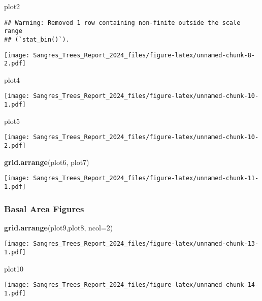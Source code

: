 \documentclass[
]{article}
\newenvironment{Shaded}{\begin{snugshade}}{\end{snugshade}}
\newcommand{\AttributeTok}[1]{\textcolor[rgb]{0.13,0.29,0.53}{#1}}
\newcommand{\DecValTok}[1]{\textcolor[rgb]{0.00,0.00,0.81}{#1}}
\newcommand{\FunctionTok}[1]{\textcolor[rgb]{0.13,0.29,0.53}{\textbf{#1}}}
\newcommand{\NormalTok}[1]{#1}
\begin{document}
\begin{Shaded}
\begin{Highlighting}[]
\NormalTok{plot2}
\end{Highlighting}
\end{Shaded}

\begin{verbatim}
## Warning: Removed 1 row containing non-finite outside the scale range
## (`stat_bin()`).
\end{verbatim}

\texttt{[image: Sangres\_Trees\_Report\_2024\_files/figure-latex/unnamed-chunk-8-2.pdf]}

\begin{Shaded}
\begin{Highlighting}[]
\NormalTok{plot4}
\end{Highlighting}
\end{Shaded}

\texttt{[image: Sangres\_Trees\_Report\_2024\_files/figure-latex/unnamed-chunk-10-1.pdf]}

\begin{Shaded}
\begin{Highlighting}[]
\NormalTok{plot5}
\end{Highlighting}
\end{Shaded}

\texttt{[image: Sangres\_Trees\_Report\_2024\_files/figure-latex/unnamed-chunk-10-2.pdf]}

\begin{Shaded}
\begin{Highlighting}[]
\FunctionTok{grid.arrange}\NormalTok{(plot6, plot7)}
\end{Highlighting}
\end{Shaded}

\texttt{[image: Sangres\_Trees\_Report\_2024\_files/figure-latex/unnamed-chunk-11-1.pdf]}

\hypertarget{basal-area-figures}{%
\subsubsection{Basal Area Figures}\label{basal-area-figures}}

\begin{Shaded}
\begin{Highlighting}[]
\FunctionTok{grid.arrange}\NormalTok{(plot9,plot8, }\AttributeTok{ncol=}\DecValTok{2}\NormalTok{)}
\end{Highlighting}
\end{Shaded}

\texttt{[image: Sangres\_Trees\_Report\_2024\_files/figure-latex/unnamed-chunk-13-1.pdf]}

\begin{Shaded}
\begin{Highlighting}[]
\NormalTok{plot10}
\end{Highlighting}
\end{Shaded}

\texttt{[image: Sangres\_Trees\_Report\_2024\_files/figure-latex/unnamed-chunk-14-1.pdf]}
\end{document}
